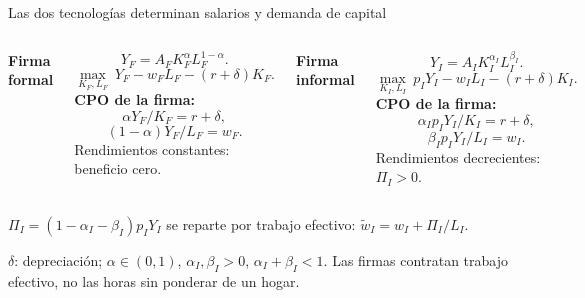 \documentclass[aspectratio=169,11pt]{beamer}
\newcommand{\source}[1]{\par\vfill{\fontsize{8}{9.5}\selectfont\color{Gray}#1\par}}
\newcommand{\takeaway}[1]{\par\vspace{2mm}\begingroup\setlength{\fboxsep}{2.2mm}\colorbox{Pale}{\begin{minipage}{\dimexpr\linewidth-4.4mm\relax}\small\raggedright #1\end{minipage}}\endgroup\par}
\newcommand{\labeltext}[1]{\par{\small\bfseries\color{Teal}#1\par}\vspace{1.5mm}}
\begin{document}
\begin{frame}{Las dos tecnologías determinan salarios y demanda de capital}
\begin{columns}[T,onlytextwidth]
\labeltext{Firma formal}
\begin{equation}Y_F=A_FK_F^\alpha L_F^{1-\alpha}.\end{equation}
\begin{equation}\max_{K_F,L_F}\ Y_F-w_FL_F-(r+\delta)K_F.\end{equation}
{\footnotesize\bfseries\color{Teal}CPO de la firma:}\begin{equation}\alpha Y_F/K_F=r+\delta,\end{equation}
\begin{equation}(1-\alpha)Y_F/L_F=w_F.\end{equation}
Rendimientos constantes: beneficio cero.
\labeltext{Firma informal}
\begin{equation}Y_I=A_IK_I^{\alpha_I}L_I^{\beta_I}.\end{equation}
\begin{equation}\max_{K_I,L_I}\ p_IY_I-w_IL_I-(r+\delta)K_I.\end{equation}
{\footnotesize\bfseries\color{Teal}CPO de la firma:}\begin{equation}\alpha_Ip_IY_I/K_I=r+\delta,\end{equation}
\begin{equation}\beta_Ip_IY_I/L_I=w_I.\end{equation}
Rendimientos decrecientes: $\Pi_I>0$.
\end{columns}
\takeaway{$\Pi_I=(1-\alpha_I-\beta_I)p_IY_I$ se reparte por trabajo efectivo: $\widetilde w_I=w_I+\Pi_I/L_I$.}
\source{$\delta$: depreciación; $\alpha\in(0,1)$, $\alpha_I,\beta_I>0$, $\alpha_I+\beta_I<1$. Las firmas contratan trabajo efectivo, no las horas sin ponderar de un hogar.}
\end{frame}
\end{document}
